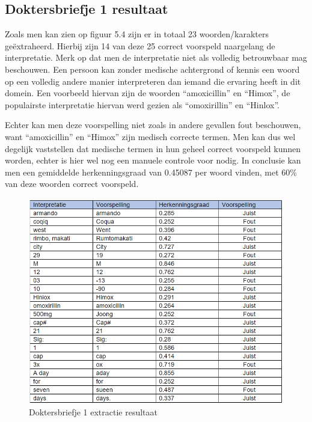 \subsection{Doktersbriefje 1 resultaat}
Zoals men kan zien op figuur 5.4 zijn er in totaal 23 woorden/karakters geëxtraheerd. Hierbij zijn 14 van deze 25 correct voorspeld naargelang de interpretatie. Merk op dat men de interpretatie niet als volledig betrouwbaar mag beschouwen. Een persoon kan zonder medische achtergrond of kennis een woord op een volledig andere manier interpreteren dan iemand die ervaring heeft in dit domein. Een voorbeeld hiervan zijn de woorden “amoxicillin” en “Himox”, de populairste interpretatie hiervan werd gezien als “omoxirillin” en “Hinlox”.  


Echter kan men deze voorspelling niet zoals in andere gevallen fout beschouwen, want “amoxicillin” en “Himox” zijn medisch correcte termen. Men kan dus wel degelijk vaststellen dat medische termen in hun geheel correct voorspeld kunnen worden, echter is hier wel nog een manuele controle voor nodig.  In conclusie kan men een gemiddelde herkenningsgraad van 0.45087 per woord vinden, met 60\% van deze woorden correct voorspeld. 
\begin{figure}[h]
	
	\includegraphics[width=\textwidth,height=\textheight,keepaspectratio]{../Foto's/doktersbriefje1_tabel}
	\captionsetup{justification=centering,margin=2cm}
	\caption{Doktersbriefje 1 extractie resultaat}
	\centering
\end{figure}
\clearpage
